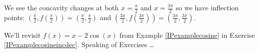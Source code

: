\documentclass{ximera}
\begin{document}
\begin{example}
\begin{image}

\end{image}



We see the concavity changes at both $x = \frac{\pi}{2}$ and $x = \frac{3\pi}{2}$ so we have inflection points:  $\left( \frac{\pi}{2}, f\left( \frac{\pi}{2} \right) \right) = \left( \frac{\pi}{2},\frac{\pi}{2} \right)$ and $\left( \frac{3\pi}{2}, f\left( \frac{3\pi}{2} \right) \right) = \left( \frac{3\pi}{2},\frac{3\pi}{2} \right)$.

  \begin{center}
  \end{center}
      


\end{example}

We'll revisit  $f(x) = x-2\cos(x)$ from Example \ref{IPexamplecosine} in Exercise \ref{IPexamplecosineincdec}.  Speaking of Exercises \ldots


\closegraphsfile
\end{document}
